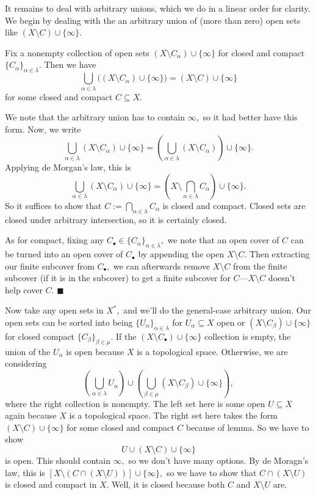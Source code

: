 It remains to deal with arbitrary unions, which we do in a linear order for clarity. We begin by dealing with the an arbitrary union of (more than zero) open sets like $(X\setminus C)\cup\{\infty\}.$
\begin{lemma}
    Fix a nonempty collection of open sets $(X\setminus C_\alpha)\cup\{\infty\}$ for closed and compact $\{C_\alpha\}_{\alpha\in\lambda}.$ Then we have
    \[\bigcup_{\alpha\in\lambda}\big((X\setminus C_\alpha)\cup\{\infty\}\big)=(X\setminus C)\cup\{\infty\}\]
    for some closed and compact $C\subseteq X.$
\end{lemma}    
We note that the arbitrary union has to contain $\infty,$ so it had better have this form. Now, we write
\[\bigcup_{\alpha\in\lambda}(X\setminus C_\alpha)\cup\{\infty\}=\left(\bigcup_{\alpha\in\lambda}(X\setminus C_\alpha)\right)\cup\{\infty\}.\]
Applying de Morgan's law, this is
\[\bigcup_{\alpha\in\lambda}(X\setminus C_\alpha)\cup\{\infty\}=\left(X\setminus\bigcap_{\alpha\in\lambda}C_\alpha\right)\cup\{\infty\}.\]
So it suffices to show that $C:=\bigcap_{\alpha\in\lambda}C_\alpha$ is closed and compact. Closed sets are closed under arbitrary intersection, so it is certainly closed.

As for compact, fixing any $C_\bullet\in\{C_\alpha\}_{\alpha\in\lambda},$ we note that an open cover of $C$ can be turned into an open cover of $C_\bullet$ by appending the open $X\setminus C.$ Then extracting our finite subcover from $C_\bullet,$ we can afterwards remove $X\setminus C$ from the finite subcover (if it is in the subcover) to get a finite subcover for $C$---$X\setminus C$ doesn't help cover $C.$ $\blacksquare$

Now take any open sets in $X^*,$ and we'll do the general-case arbitrary union. Our open sets can be sorted into being $\{U_\alpha\}_{\alpha\in\lambda}$ for $U_\alpha\subseteq X$ open or $(X\setminus C_\beta)\cup\{\infty\}$ for closed compact $\{C_\beta\}_{\beta\in\mu}.$ If the $(X\setminus C_\bullet)\cup\{\infty\}$ collection is empty, the union of the $U_\alpha$ is open because $X$ is a topological space. Otherwise, we are considering
\[\left(\bigcup_{\alpha\in\lambda}U_\alpha\right)\cup\left(\bigcup_{\beta\in\mu}(X\setminus C_\beta)\cup\{\infty\}\right),\]
where the right collection is nonempty. The left set here is some open $U\subseteq X$ again because $X$ is a topological space. The right set here takes the form $(X\setminus C)\cup\{\infty\}$ for some closed and compact $C$ because of lemma. So we have to show
\[U\cup(X\setminus C)\cup\{\infty\}\]
is open. This should contain $\infty,$ so we don't have many options. By de Moragn's law, this is $[X\setminus(C\cap(X\setminus U))]\cup\{\infty\},$ so we have to show that $C\cap(X\setminus U)$ is closed and compact in $X.$ Well, it is closed because both $C$ and $X\setminus U$ are.

